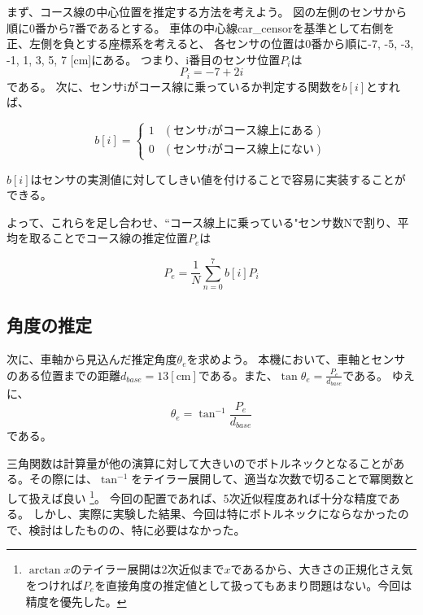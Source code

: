 \documentclass{ltjsreport}
\begin{document}
まず、コース線の中心位置を推定する方法を考えよう。
図の左側のセンサから順に0番から7番であるとする。
車体の中心線car\_censorを基準として右側を正、左側を負とする座標系を考えると、
各センサの位置は0番から順に-7, -5, -3, -1, 1, 3, 5, 7 [cm]にある。
つまり、i番目のセンサ位置$P_i$は
\[ 
      P_i = -7 + 2i
\]
である。
次に、センサiがコース線に乗っているか判定する関数を$b[i]$とすれば、

\begin{equation}
  b[i] = 
  \begin{cases}
   1 & (センサiがコース線上にある) \\
   0 & (センサiがコース線上にない)
   \end{cases}
\end{equation}

$b[i]$はセンサの実測値に対してしきい値を付けることで容易に実装することができる。

よって、これらを足し合わせ、``コース線上に乗っている"センサ数Nで割り、平均を取ることでコース線の推定位置$P_e$は

\[ 
  P_e = \frac{1}{N} \sum_{n=0}^7 b[i] P_i
    \]

\subsection{角度の推定}

次に、車軸から見込んだ推定角度$\theta_e$を求めよう。
本機において、車軸とセンサのある位置までの距離$d_{base} = 13 [\mathrm{cm}]$である。また、$\tan \theta_e = \frac{P_e}{d_{base}}$である。
ゆえに、
\[
  \theta_e =  \tan^{-1} \frac{P_e}{d_{base}}
\]
である。

三角関数は計算量が他の演算に対して大きいのでボトルネックとなることがある。その際には、$\tan^{-1}$をテイラー展開して、適当な次数で切ることで冪関数として扱えば良い
\footnote{$\arctan x$のテイラー展開は2次近似まで$x$であるから、大きさの正規化さえ気をつければ$P_e$を直接角度の推定値として扱ってもあまり問題はない。今回は精度を優先した。}。
今回の配置であれば、5次近似程度あれば十分な精度である。
しかし、実際に実験した結果、今回は特にボトルネックにならなかったので、検討はしたものの、特に必要はなかった。
\end{document}
